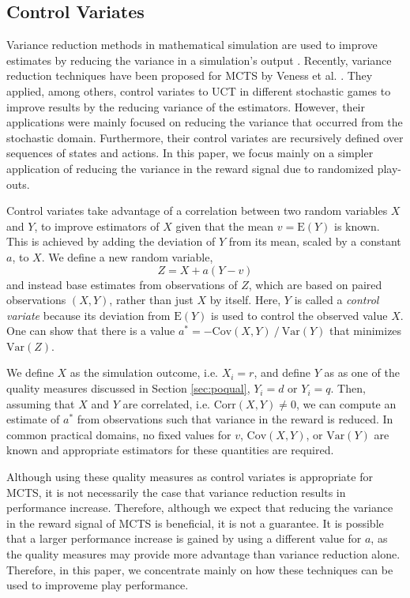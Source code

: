 \documentclass{ecai2014}
\newcommand\todo[1]{\textcolor{red}{#1}}
\newcommand{\E}[1]{\mathrm{E}\left( #1 \right)}
\newcommand{\Var}[1]{\mathrm{Var}\left( #1 \right)}
\newcommand{\Cov}[1]{\mathrm{Cov}\left( #1 \right)}
\newcommand{\Corr}[1]{\mathrm{Corr}\left( #1 \right)}
\begin{document}
\subsection{Control Variates}
\label{sub:cv}
Variance reduction methods in mathematical simulation are used to improve estimates by reducing the variance in a simulation's output \cite{kelton2000simulation}. Recently, variance reduction techniques have been proposed for MCTS by Veness et al. \cite{Veness11variance}. They applied, among others, control variates to UCT in different stochastic games to improve results by the reducing variance of the estimators. However, their applications were mainly focused on reducing the variance that occurred from the stochastic domain. Furthermore, their control variates are recursively defined over sequences of states and actions. In this paper, we focus mainly on a simpler application of reducing the variance in the reward signal due to randomized play-outs.  

Control variates take advantage of a correlation between two random variables $X$ and $Y$, to improve estimators of $X$ given that the mean $v=\E{Y}$ is known. This is achieved by adding the deviation of $Y$ from its mean, scaled by a constant $a$, to $X$. We define a new random variable, 
\begin{equation}
Z=X+a\left(Y-v\right)
\end{equation}
and instead base estimates from observations of $Z$, which are based on paired observations $(X,Y)$, rather than just $X$ by itself. 
Here, $Y$ is called a {\it control variate} because its deviation from $\E{Y}$ is used to control the observed value $X$. 
One can show that there is a value $a^*=-\Cov{X,Y}\mathbin{/}\Var{Y}$ that minimizes $\Var{Z}$.

We define $X$ as the simulation outcome, i.e. $X_i=r$, and define $Y$ as as one of the quality measures discussed in Section \ref{sec:poqual}, $Y_i=d$ or $Y_i=q$. Then, assuming that $X$ and $Y$ are correlated, i.e. $\Corr{X,Y}\neq0$, we can compute an estimate of  $a^*$ from observations such that variance in the reward is reduced. In common practical domains, no fixed values for $v$, $\Cov{X,Y}$, or $\Var{Y}$ are known and appropriate estimators for these quantities are required.

Although using these quality measures as control variates is appropriate for MCTS, it is not necessarily the case that variance reduction results in performance increase. Therefore, although we expect that reducing the variance in the reward signal of MCTS is beneficial, it is not a guarantee. It is possible that a larger performance increase is gained by using a different value for $a$, as the quality measures may provide more advantage than variance reduction alone. Therefore, in this paper, we concentrate mainly on how these techniques can be used to improveme play performance. 
\end{document}
